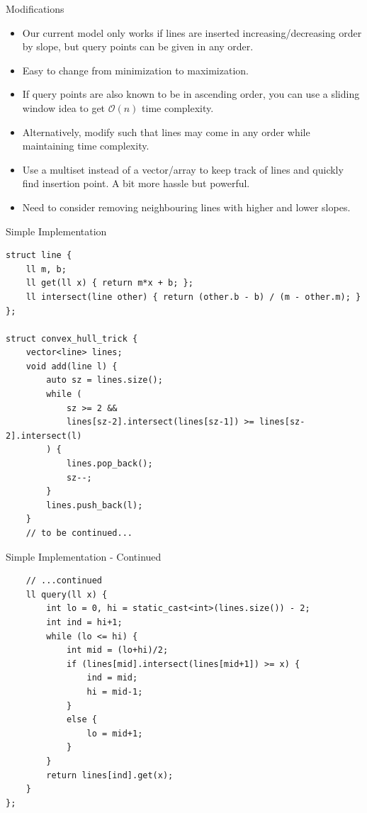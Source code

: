 \documentclass{beamer}
\begin{document}
\begin{frame}[plain]{Modifications}
    \begin{itemize}
        \item<1-> Our current model only works if lines are inserted increasing/decreasing order by slope, but query points can be given in any order.
        \item<2-> Easy to change from minimization to maximization.
        \item<3-> If query points are also known to be in ascending order, you can use a sliding window idea to get $\mathcal{O}(n)$ time complexity.
        \item<4-> Alternatively, modify such that lines may come in any order while maintaining time complexity.
        \item<5-> Use a multiset instead of a vector/array to keep track of lines and quickly find insertion point. A bit more hassle but powerful.
        \item<6-> Need to consider removing neighbouring lines with higher and lower slopes.
    \end{itemize}
\end{frame}

\begin{frame}{Simple Implementation}
    \begin{scriptsize}
        \begin{verbatim}
struct line {
    ll m, b;
    ll get(ll x) { return m*x + b; };
    ll intersect(line other) { return (other.b - b) / (m - other.m); }
};

struct convex_hull_trick {
    vector<line> lines;
    void add(line l) {
        auto sz = lines.size();
        while (
            sz >= 2 &&
            lines[sz-2].intersect(lines[sz-1]) >= lines[sz-2].intersect(l)
        ) {
            lines.pop_back();
            sz--;
        }
        lines.push_back(l);
    }
    // to be continued...
        \end{verbatim}
    \end{scriptsize}
\end{frame}

\begin{frame}{Simple Implementation - Continued}
    \begin{scriptsize}
        \begin{verbatim}
    // ...continued
    ll query(ll x) {
        int lo = 0, hi = static_cast<int>(lines.size()) - 2;
        int ind = hi+1;
        while (lo <= hi) {
            int mid = (lo+hi)/2;
            if (lines[mid].intersect(lines[mid+1]) >= x) {
                ind = mid;
                hi = mid-1;
            }
            else {
                lo = mid+1;
            }
        }
        return lines[ind].get(x);
    }
};
        \end{verbatim}
    \end{scriptsize}
\end{frame}
\end{document}
